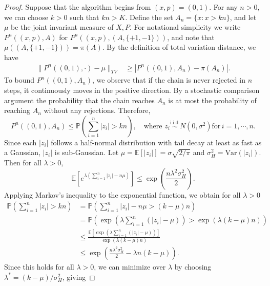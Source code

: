 \documentclass{article}
\theoremstyle{definition}
\theoremstyle{plain}
\begin{document}
\begin{proof}
Suppose that the algorithm begins from $(x,p) = (0,1)$. For any $n>0$, we can choose $k>0$ such that $kn>K$. Define the set $A_n = \{x:x>kn\}$, and let $\mu$ be the joint invariant measure of $X,P$. For notational simplicity we write $P^n((x,p),A)$ for $P^n((x,p),(A,\{+1,-1\}))$, and note that $\mu((A,\{+1,-1\})) = \pi(A)$.  By the definition of total variation distance, we have
\begin{align}
    \|P^n((0,1),\cdot) - \mu\|_{TV} &\ge |P^n((0,1),A_n) - \pi(A_n)|.
\end{align}    
To bound $P^n((0,1),A_n)$, we observe that if the chain is never rejected in $n$ steps, it continuously moves in the positive direction. By a stochastic comparison argument the probability that the chain reaches $A_n$ is at most the probability of reaching $A_n$ without any rejections. Therefore,
\begin{equation*}
    P^n((0,1),A_n) \le \mathbb{P}\left(\sum_{i=1}^n |z_i|>kn\right), \quad \text{where } z_i \stackrel{\text{i.i.d.}}{\sim} N(0,\sigma^2) \text{for} \, i=1, \cdots ,n.
\end{equation*}
Since each $|z_i|$ follows a half-normal distribution with tail decay at least as fast as a Gaussian, $|z_i|$ is sub-Gaussian. Let $\mu = \mathbb{E}[|z_i|] = \sigma\sqrt{2/\pi}$ and $\sigma_H^2 = \text{Var}(|z_i|)$. Then for all $\lambda>0$,
\begin{equation*}
    \mathbb{E}\left[e^{\lambda(\sum_{i=1}^n |z_i| - n\mu)}\right]\le \exp\left(\frac{n\lambda^2\sigma_H^2}{2}\right).
\end{equation*}
Applying Markov's inequality to the exponential function, we obtain for all $\lambda>0$
\begin{equation}
\begin{aligned}
    \mathbb{P}\left(\sum_{i=1}^n|z_i| >kn\right) &= \mathbb{P}\left(\sum_{i=1}^n|z_i| - n\mu>(k-\mu)n\right)\\
    &= \mathbb{P}\left(\exp\left(\lambda \sum_{i=1}^n(|z_i| - \mu)\right) >\exp(\lambda(k-\mu)n)\right)\\
    &\le \frac{\mathbb{E}\left[\exp\left(\lambda \sum_{i=1}^n(|z_i| - \mu)\right)\right]}{\exp(\lambda(k-\mu)n)}\\
    &\le \exp\left(\frac{n\lambda^2\sigma_H^2}{2} - \lambda n (k-\mu)\right).
\end{aligned}
\end{equation}
Since this holds for all $\lambda>0$, we can minimize over $\lambda$ by choosing $\lambda^* = (k-\mu)/\sigma_H^2$, giving

\end{proof}
\end{document}
